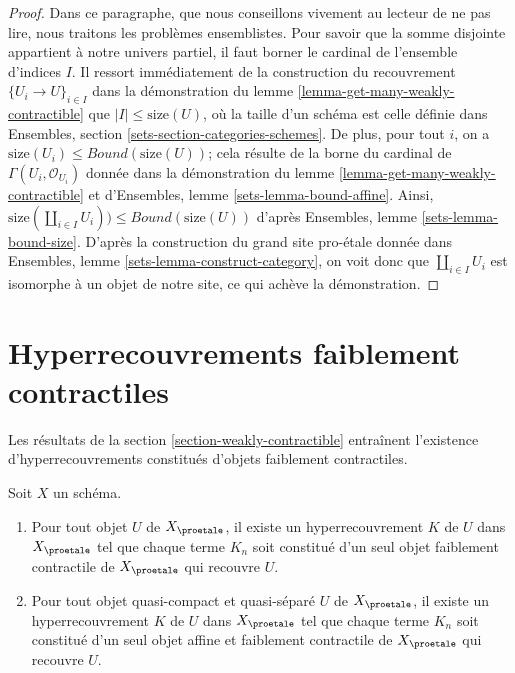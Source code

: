 \begin{proof}
\medskip\noindent
Dans ce paragraphe, que nous conseillons vivement au lecteur de ne pas lire, nous traitons
les problèmes ensemblistes. Pour savoir que la somme disjointe
appartient à notre univers partiel, il faut borner le cardinal de
l'ensemble d'indices $I$. Il ressort immédiatement de la construction du
recouvrement $\{U_i \to U\}_{i \in I}$ dans la démonstration du
lemme \ref{lemma-get-many-weakly-contractible}
que $|I| \leq \text{size}(U)$, où la taille d'un schéma est celle
définie dans Ensembles, section \ref{sets-section-categories-schemes}.
De plus, pour tout $i$, on a
$\text{size}(U_i) \leq Bound(\text{size}(U))$;
cela résulte de la borne du cardinal de
$\Gamma(U_i, \mathcal{O}_{U_i})$ donnée dans
la démonstration du lemme \ref{lemma-get-many-weakly-contractible}
et d'Ensembles, lemme \ref{sets-lemma-bound-affine}.
Ainsi, $\text{size}(\coprod_{i \in I} U_i)) \leq Bound(\text{size}(U))$
d'après Ensembles, lemme \ref{sets-lemma-bound-size}.
D'après la construction du grand site pro-\'etale donnée dans
Ensembles, lemme \ref{sets-lemma-construct-category},
on voit donc que $\coprod_{i \in I} U_i$ est isomorphe à un objet
de notre site, ce qui achève la démonstration.
\end{proof}






\section{Hyperrecouvrements faiblement contractiles}
\label{section-hypercovering}

\noindent
Les résultats de la section \ref{section-weakly-contractible}
entraînent l'existence d'hyperrecouvrements constitués d'objets
faiblement contractiles.

\begin{lemma}
\label{lemma-w-contractible-hypercovering}
Soit $X$ un schéma.
\begin{enumerate}
\item Pour tout objet $U$ de $X_\proetale$, il existe un hyperrecouvrement
$K$ de $U$ dans $X_\proetale$ tel que chaque terme $K_n$ soit constitué d'un
seul objet faiblement contractile de $X_\proetale$ qui recouvre $U$.
\item Pour tout objet quasi-compact et quasi-séparé $U$ de $X_\proetale$,
il existe un hyperrecouvrement $K$ de $U$ dans $X_\proetale$ tel que chaque
terme $K_n$ soit constitué d'un seul objet affine et faiblement contractile de
$X_\proetale$ qui recouvre $U$.
\end{enumerate}
\end{lemma}

